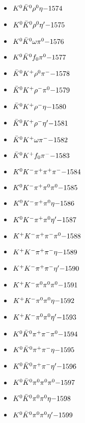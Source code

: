 \begin{multicols}{3}
\begin{itemize}
 \item $ K^{0} \bar{K}^{0} \rho^{0} \eta \hfill{-1574}$
 \item $ K^{0} \bar{K}^{0} \rho^{0} {\eta^{\prime}} \hfill{-1575}$
 \item $ K^{0} \bar{K}^{0} \omega \pi^{0} \hfill{-1576}$
 \item $ K^{0} \bar{K}^{0} f_{0} \pi^{0} \hfill{-1577}$
 \item $ \bar{K}^{0} K^{+} \rho^{0} \pi^{-} \hfill{-1578}$
 \item $ \bar{K}^{0} K^{+} \rho^{-} \pi^{0} \hfill{-1579}$
 \item $ \bar{K}^{0} K^{+} \rho^{-} \eta \hfill{-1580}$
 \item $ \bar{K}^{0} K^{+} \rho^{-} {\eta^{\prime}} \hfill{-1581}$
 \item $ \bar{K}^{0} K^{+} \omega \pi^{-} \hfill{-1582}$
 \item $ \bar{K}^{0} K^{+} f_{0} \pi^{-} \hfill{-1583}$
 \item $ K^{0} K^{-} \pi^{+} \pi^{+} \pi^{-} \hfill{-1584}$
 \item $ K^{0} K^{-} \pi^{+} \pi^{0} \pi^{0} \hfill{-1585}$
 \item $ K^{0} K^{-} \pi^{+} \pi^{0} \eta \hfill{-1586}$
 \item $ K^{0} K^{-} \pi^{+} \pi^{0} {\eta^{\prime}} \hfill{-1587}$
 \item $ K^{+} K^{-} \pi^{+} \pi^{-} \pi^{0} \hfill{-1588}$
 \item $ K^{+} K^{-} \pi^{+} \pi^{-} \eta \hfill{-1589}$
 \item $ K^{+} K^{-} \pi^{+} \pi^{-} {\eta^{\prime}} \hfill{-1590}$
 \item $ K^{+} K^{-} \pi^{0} \pi^{0} \pi^{0} \hfill{-1591}$
 \item $ K^{+} K^{-} \pi^{0} \pi^{0} \eta \hfill{-1592}$
 \item $ K^{+} K^{-} \pi^{0} \pi^{0} {\eta^{\prime}} \hfill{-1593}$
 \item $ K^{0} \bar{K}^{0} \pi^{+} \pi^{-} \pi^{0} \hfill{-1594}$
 \item $ K^{0} \bar{K}^{0} \pi^{+} \pi^{-} \eta \hfill{-1595}$
 \item $ K^{0} \bar{K}^{0} \pi^{+} \pi^{-} {\eta^{\prime}} \hfill{-1596}$
 \item $ K^{0} \bar{K}^{0} \pi^{0} \pi^{0} \pi^{0} \hfill{-1597}$
 \item $ K^{0} \bar{K}^{0} \pi^{0} \pi^{0} \eta \hfill{-1598}$
 \item $ K^{0} \bar{K}^{0} \pi^{0} \pi^{0} {\eta^{\prime}} \hfill{-1599}$

\end{itemize}
\end{multicols}
